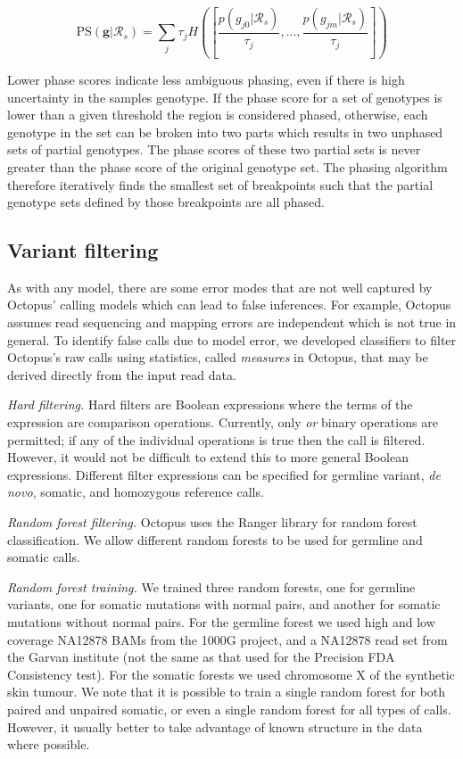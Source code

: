 \documentclass[notitlepage, twocolumn]{article}
\begin{document}
\begin{equation*}
    \text{PS}(\boldsymbol{g} | \mathcal{R}_s) = \sum_j \tau_j H\left(\left[\frac{p(g_{j0} | \mathcal{R}_s)}{\tau_j}, ..., \frac{p(g_{jm}| \mathcal{R}_s)}{\tau_j}\right]\right)
\end{equation*}

Lower phase scores indicate less ambiguous phasing, even if there is high uncertainty in the samples genotype. If the phase score for a set of genotypes is lower than a given threshold the region is considered phased, otherwise, each genotype in the set can be broken into two parts which results in two unphased sets of partial genotypes. The phase scores of these two partial sets is never greater than the phase score of the original genotype set. The phasing algorithm therefore iteratively finds the smallest set of breakpoints such that the partial genotype sets defined by those breakpoints are all phased.

\subsection*{Variant filtering}

As with any model, there are some error modes that are not well captured by Octopus’ calling models which can lead to false inferences. For example, Octopus assumes read sequencing and mapping errors are independent which is not true in general. To identify false calls due to model error, we developed classifiers to filter Octopus’s raw calls using statistics, called \emph{measures} in Octopus, that may be derived directly from the input read data.

\emph{Hard filtering.} Hard filters are Boolean expressions where the terms of the expression are comparison operations. Currently, only \emph{or} binary operations are permitted; if any of the individual operations is true then the call is filtered. However, it would not be difficult to extend this to more general Boolean expressions. Different filter expressions can be specified for germline variant, \textit{de novo}, somatic, and homozygous reference calls.

\emph{Random forest filtering.} Octopus uses the Ranger library \cite{RN564} for random forest classification. We allow different random forests to be used for germline and somatic calls.

\emph{Random forest training.} We trained three random forests, one for germline variants, one for somatic mutations with normal pairs, and another for somatic mutations without normal pairs. For the germline forest we used high and low coverage NA12878 BAMs from the 1000G project, and a NA12878 read set from the Garvan institute (not the same as that used for the Precision FDA Consistency test). For the somatic forests we used chromosome X of the synthetic skin tumour. We note that it is possible to train a single random forest for both paired and unpaired somatic, or even a single random forest for all types of calls. However, it usually better to take advantage of known structure in the data where possible.
\end{document}
